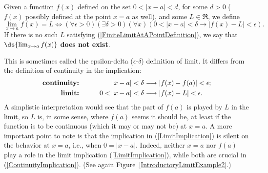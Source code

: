 \begin{definition} Given a function $f(x)$ defined on the set
$0<|x-a|<d$, for some $d>0$ ($f(x)$  possibly defined at the point $x=a$ as
well), and some $L\in\Re$, we define
\begin{equation}
\lim_{x\to a}f(x)=L\iff
(\forall\epsilon>0)(\exists\delta>0)(\forall x)(
0<|x-a|<\delta\longrightarrow |f(x)-L|<\epsilon).
\label{FiniteLimitAtAPointDefinition}
\end{equation}
If there is no such $L$ satisfying
{\rm (\ref{FiniteLimitAtAPointDefinition})}, we say
that $\ds{\lim_{x\to a}f(x)}$ {\rm\bf does not exist}.\footnotemark
\end{definition}
This is sometimes called the epsilon-delta ($\epsilon$-$\delta$)
definition of limit.  It differs from the definition of
continuity in the implication:
\begin{alignat}{2}
\text{\bf continuity:}&
              \qquad&|x-a|<\delta&\longrightarrow|f(x)-f(a)|<\epsilon;
               \label{ContinuityImplication}\\
\text{\bf limit:}&&0<|x-a|<\delta&\longrightarrow|f(x)-L|<\epsilon.
               \label{LimitImplication}
\end{alignat}
A simplistic interpretation would see that the part of $f(a)$ is
played by $L$ in the limit, so $L$ is, in some sense, where
$f(a)$ seems it should be, at least if the function is to be
continuous (which it may or may not be) at $x=a$.
A more important point to note is that the implication
in (\ref{LimitImplication}) is silent on the behavior 
at $x=a$, i.e., when $0=|x-a|$.  Indeed, neither
$x=a$ nor $f(a)$ play a role in the limit implication
(\ref{LimitImplication}),
while both are crucial in (\ref{ContinuityImplication}).
(See again Figure~\ref{IntroductoryLimitExample2}.)



